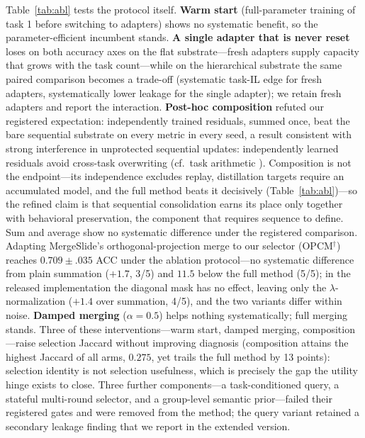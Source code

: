 \documentclass{article}
\begin{document}
Table~\ref{tab:abl} tests the protocol itself.
\textbf{Warm start} (full-parameter training of task 1 before switching to adapters) shows no systematic benefit, so the parameter-efficient incumbent stands.
\textbf{A single adapter that is never reset} loses on both accuracy axes on the flat substrate---fresh adapters supply capacity that grows with the task count---while on the hierarchical substrate the same paired comparison becomes a trade-off (systematic task-IL edge for fresh adapters, systematically lower leakage for the single adapter); we retain fresh adapters and report the interaction.
\textbf{Post-hoc composition} refuted our registered expectation: independently trained residuals, summed once, beat the bare sequential substrate on every metric in every seed, a result consistent with strong interference in unprotected sequential updates: independently learned residuals avoid cross-task overwriting (cf.\ task arithmetic \cite{ilharco2023task}). Composition is not the endpoint---its independence excludes replay, distillation targets require an accumulated model, and the full method beats it decisively (Table~\ref{tab:abl})---so the refined claim is that sequential consolidation earns its place only together with behavioral preservation, the component that requires sequence to define. Sum and average show no systematic difference under the registered comparison. Adapting MergeSlide's orthogonal-projection merge \cite{bui2026mergeslide} to our selector (OPCM$^\dagger$) reaches $0.709{\pm}.035$ ACC under the ablation protocol---no systematic difference from plain summation ($+1.7$, 3/5) and $11.5$ below the full method (5/5); in the released implementation the diagonal mask has no effect, leaving only the $\lambda$-normalization ($+1.4$ over summation, 4/5), and the two variants differ within noise.
\textbf{Damped merging} ($\alpha{=}0.5$) helps nothing systematically; full merging stands.
Three of these interventions---warm start, damped merging, composition---raise selection Jaccard without improving diagnosis (composition attains the highest Jaccard of all arms, $0.275$, yet trails the full method by 13 points): selection identity is not selection usefulness, which is precisely the gap the utility hinge exists to close.
Three further components---a task-conditioned query, a stateful multi-round selector, and a group-level semantic prior---failed their registered gates and were removed from the method; the query variant retained a secondary leakage finding that we report in the extended version.

\end{document}
